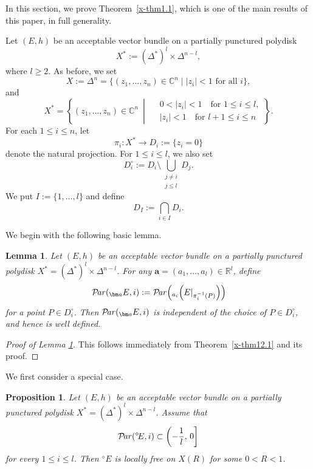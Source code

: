 \documentclass[12pt,twoside]{amsart}
\DeclareMathOperator{\Par}{\mathcal{P}\!\it{ar}}
\newtheorem{lem}[thm]{Lemma}
\newtheorem{prop}[thm]{Proposition}
\theoremstyle{definition}
\begin{document}
In this section, we prove Theorem~\ref{x-thm1.1}, 
which is one of the main
results of this paper, in full generality.

\medskip

Let $(E,h)$ be an acceptable vector bundle on a partially 
punctured polydisk 
\[
X^*:=(\Delta^*)^l\times \Delta^{n-l},
\]
where $l\geq2$.
As before, we set
\[
X:=\Delta^n
=\{(z_1,\ldots,z_n)\in\mathbb C^n \mid |z_i|<1 \text{ for all } i\},
\]
and
\[
X^*
=\left\{(z_1,\ldots,z_n)\in\mathbb C^n \ \middle|\
\begin{aligned}
&0<|z_i|<1 \quad \text{for } 1\le i\le l,\\
&|z_i|<1 \quad \text{for } l+1\le i\le n
\end{aligned}
\right\}.
\]
For each $1\le i\le n$, let
\[
\pi_i\colon X^*\to D_i:=\{z_i=0\}
\]
denote the natural projection.
For $1\le i\le l$, we also set
\[
D_i^\circ:=D_i\setminus \bigcup_{\substack{j\ne i\\ j\le l}} D_j.
\] 
We put $I:=\{1, \ldots, l\}$ and define 
\[
D_I:=\bigcap _{i\in I} D_i. 
\]

\medskip

We begin with the following basic lemma.

\begin{lem}\label{x-lem13.1}
Let $(E,h)$ be an acceptable vector bundle on a partially 
punctured polydisk 
$X^*=(\Delta^*)^l\times \Delta^{n-l}$.
For any $\bm a=(a_1,\ldots,a_l)\in\mathbb R^l$, define
\[
\Par(_{\bm a}E,i)
:=\Par\!\left(_{a_i}\!\left(E|_{\pi_i^{-1}(P)}\right)\right)
\]
for a point $P\in D_i^\circ$.
Then $\Par(_{\bm a}E,i)$ is independent of the choice of
$P\in D_i^\circ$, and hence is well defined.
\end{lem}

\begin{proof}[Proof of Lemma \ref{x-lem13.1}]
This follows immediately from Theorem~\ref{x-thm12.1} and 
its proof.
\end{proof}

We first consider a special case.

\begin{prop}\label{x-prop13.2} 
Let $(E,h)$ be an acceptable vector bundle on a 
partially punctured polydisk 
$X^*=(\Delta^*)^l\times \Delta^{n-l}$.
Assume that
\begin{equation}\label{x-eq13.1}
\Par({}^\diamond\!E,i)\subset \left(-\frac{1}{l},\,0\right]
\end{equation}
for every $1\le i\le l$.
Then ${}^\diamond\!E$ is locally free on $X(R)$ for some $0<R<1$.
\end{prop}
\end{document}
